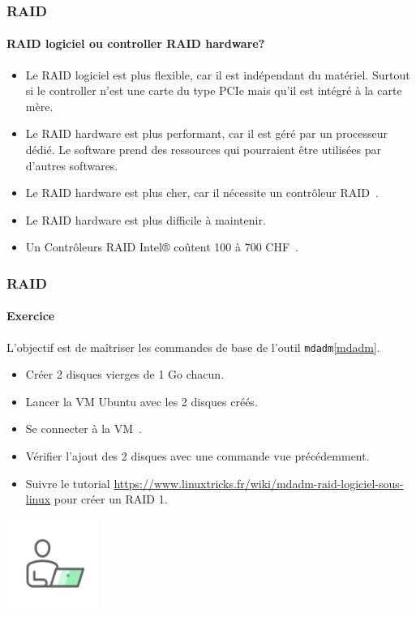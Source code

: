 \documentclass{beamer}
\begin{document}
    \begin{frame}
        \transdissolve
        \frametitle{RAID}
        \framesubtitle{RAID logiciel ou controller RAID hardware?}
        \begin{itemize}
            \item Le RAID logiciel est plus flexible, car il est indépendant du matériel.
            Surtout si le controller n'est une carte du type PCIe mais qu'il est intégré à la carte mère.
            \item Le RAID hardware est plus performant, car il est géré par un processeur dédié.
            Le software prend des ressources qui pourraient être utilisées par d'autres softwares.
            \item Le RAID hardware est plus cher, car il nécessite un contrôleur RAID~.
            \item Le RAID hardware est plus difficile à maintenir.
            \item Un Contrôleurs RAID Intel® coûtent 100 à 700 CHF~.
        \end{itemize}
    \end{frame}

    \begin{frame}
        \transdissolve
        \frametitle{RAID}
        \framesubtitle{Exercice \execcounterdispinc{}}
        L'objectif est de maîtriser les commandes de base de l'outil \lstinline{mdadm}\cref{mdadm}.
        \begin{itemize}
            \item Créer 2 disques vierges de 1 Go chacun.
            \item Lancer la VM Ubuntu avec les 2 disques créés.
            \item Se connecter à la VM~.
            \item Vérifier l'ajout des 2 disques avec une commande vue précédemment.
            \item Suivre le tutorial \url{https://www.linuxtricks.fr/wiki/mdadm-raid-logiciel-sous-linux} pour créer un RAID 1.
        \end{itemize}
        \bigbreak
        \centering
        \includegraphics[width=3cm]{image/guy-in-front-of-desktop}
    \end{frame}
\end{document}
